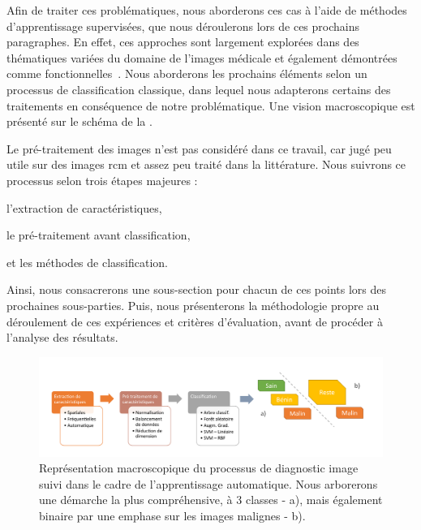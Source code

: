 Afin de traiter ces problématiques, nous aborderons ces cas à l'aide de méthodes d'apprentissage supervisées, que nous déroulerons lors de ces prochains paragraphes. En effet, ces approches sont largement explorées dans des thématiques variées du domaine de l'images médicale et également démontrées comme fonctionnelles~\cite{Litjens2017,Pathan2018}. Nous aborderons les prochains éléments selon un processus de classification classique, dans lequel nous adapterons certains des traitements en conséquence de notre problématique. Une vision macroscopique est présenté sur le schéma de la .\par

Le pré-traitement des images n'est pas considéré dans ce travail, car jugé peu utile sur des images \gls{rcm} et assez peu traité dans la littérature. Nous suivrons ce processus selon trois étapes majeures :
\begin{inlinerate}
    \item l'extraction de caractéristiques,
    \item le pré-traitement avant classification,
    \item et les méthodes de classification.
\end{inlinerate}
Ainsi, nous consacrerons une sous-section pour chacun de ces points lors des prochaines sous-parties. Puis, nous présenterons la méthodologie propre au déroulement de ces expériences et critères d'évaluation, avant de procéder à l'analyse des résultats.\par

\begin{figure}[H]
\centering
    \includegraphics[width=\linewidth]{contents/chapter_4/resources/scheme_macro_image_classification.pdf}
    \caption{Représentation macroscopique du processus de diagnostic image suivi dans le cadre de l'apprentissage automatique. Nous arborerons une démarche la plus compréhensive, à 3 classes - a), mais également binaire par une emphase sur les images malignes - b).}
    \label{fig:scheme_macro_image_classification}
\end{figure}\par

